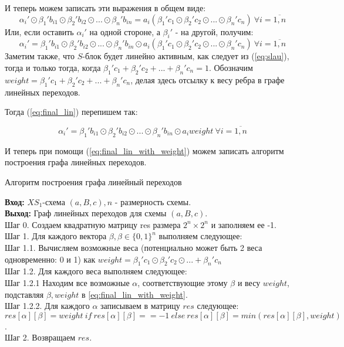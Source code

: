 \documentclass[a4paper,12pt]{report}
\theoremstyle{plain} %
\theoremstyle{definition}
\theoremstyle{remark}
\begin{document}
\begin{large}
И теперь можем записать эти выражения в общем виде:
\begin{equation}\label{eq:slau}\alpha_i' \odot \beta_1'b_{i1} \odot \beta_2'b_{i2} \odot ... \odot \beta_n'b_{in} = a_i(\beta_1'c_1 \odot \beta_2'c_2 \odot ... \odot \beta_n'c_n) ~ \forall i=\overline{1,n} \end{equation}
Или, если оставить $\alpha_i'$ на одной стороне, а $\beta_i'$ - на другой, получим:
\begin{equation}\label{eq:final_lin}\alpha_i' = \beta_1'b_{i1} \odot \beta_2'b_{i2} \odot ... \odot \beta_n'b_{in} \odot a_i(\beta_1'c_1 \odot \beta_2'c_2 \odot ... \odot \beta_n'c_n) ~ \forall i=\overline{1,n} \end{equation}
Заметим также, что $S$-блок будет линейно активным, как следует из (\ref{eq:slau}), тогда и только тогда, когда  $\beta_1'c_1 + \beta_2'c_2 + ... + \beta_n'c_n=1$. Обозначим $weight = \beta_1'c_1 + \beta_2'c_2 + ... + \beta_n'c_n$, делая здесь отсылку к весу ребра в графе линейных переходов.

Тогда  (\ref{eq:final_lin}) перепишем так:

\begin{equation}\label{eq:final_lin_with_weight}\alpha_i' = \beta_1'b_{i1} \odot \beta_2'b_{i2} \odot ... \odot \beta_n'b_{in} \odot a_iweight ~ \forall i=\overline{1,n} \end{equation}

И теперь при помощи (\ref{eq:final_lin_with_weight}) можем записать алгоритм построения графа линейных переходов.

\begin{algorithm}[H]
\caption{Алгоритм построения графа линейный переходов}
\label{diff_graph_construct}
\textbf{Вход:} $XS_1$-схема $(a, B, c), n$ - размерность схемы.\\
\textbf{Выход:} Граф линейных переходов для схемы $(a, B, c)$.\\
Шаг 0. Создаем квадратную матрицу res размера $2^n \times 2^n$ и заполняем ее -1. \\
Шаг 1. Для каждого вектора $\beta, \beta \in \{0, 1\}^n$ выполняем следующее: \\
Шаг 1.1. Вычисляем возможные веса (потенциально может быть 2 веса одновременно: 0 и 1) как $weight=\beta_1'c_1 \odot \beta_2'c_2 \odot ... + \beta_n'c_n$\\
Шаг 1.2. Для каждого веса выполняем следующее:\\
Шаг 1.2.1 Находим все возможные $\alpha$, соответствующие этому $\beta$ и весу $weight$, подставляя $\beta, weight$ в \ref{eq:final_lin_with_weight}.\\
Шаг 1.2.2. Для каждого $\alpha$ записываем в матрицу $res$ следующее: $res[\alpha][\beta] = weight ~if~ res[\alpha][\beta] == -1 ~else~res[\alpha][\beta]=min(res[\alpha][\beta], weight)  $.\\
Шаг 2. Возвращаем $res$.\\
\end{algorithm} 


\end{large}
\end{document}

